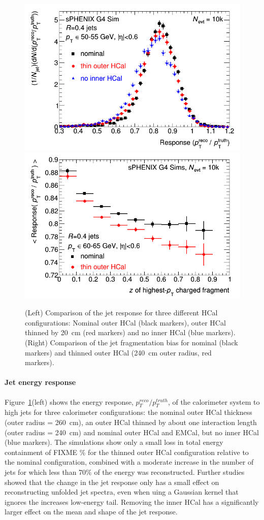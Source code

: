 \begin{figure}[hbt]
  \centering
  \includegraphics[width=0.45\linewidth]{figs/jetresponse_thinhcal}
  \hspace{0.05\linewidth}
  \includegraphics[width=0.45\linewidth]{figs/fragmentation_bias_thinhcal}
  \caption{(Left) Comparison of the jet response for three different HCal configurations: Nominal outer HCal (black markers), 
   outer HCal thinned by 20~cm (red markers) and no inner HCal (blue markers). 
   (Right) Comparison of the jet fragmentation bias for nominal (black markers) and thinned outer HCal (240~cm outer radius, red markers).}
  \label{fig:jet_energy_scale_thin_hcal}
\end{figure}
\paragraph{Jet energy response}
Figure~\ref{fig:jet_energy_scale_thin_hcal}(left) shows the energy response, $p_T^{reco}/p_T^{truth}$, 
of the calorimeter system to high \pT jets for 
three calorimeter configurations: the nominal outer HCal thickness (outer radius = 260~cm), an outer HCal thinned by about one 
interaction length (outer radius = 240~cm) and nominal outer HCal and EMCal, but no inner HCal (blue markers). The simulations 
show only a small loss in total energy containment of FIXME \% for the thinned outer HCal configuration relative to the nominal
configuration, combined with a moderate increase in the number of jets for which less than 70\% of the energy was reconstructed.
Further studies showed that the change in the jet response only has a small effect on reconstructing unfolded jet spectra,
even when uing a Gaussian kernel that ignores the increases low-energy tail. Removing the inner HCal has a significantly larger
effect on the mean and shape of the jet response.

